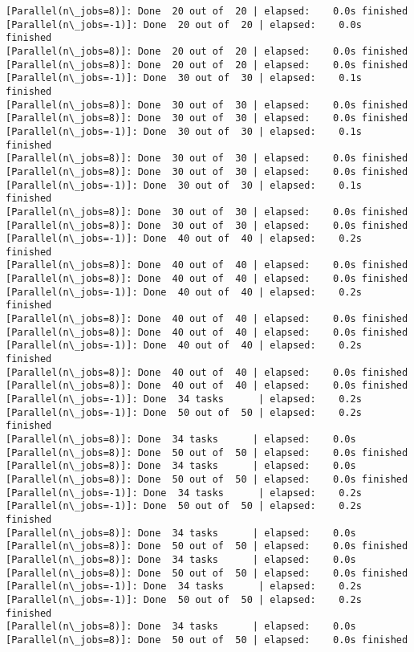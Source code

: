 \documentclass[11pt]{article}
\begin{document}
\begin{Verbatim}[commandchars=\\\{\}]
[Parallel(n\_jobs=8)]: Done  20 out of  20 | elapsed:    0.0s finished
[Parallel(n\_jobs=-1)]: Done  20 out of  20 | elapsed:    0.0s finished
[Parallel(n\_jobs=8)]: Done  20 out of  20 | elapsed:    0.0s finished
[Parallel(n\_jobs=8)]: Done  20 out of  20 | elapsed:    0.0s finished
[Parallel(n\_jobs=-1)]: Done  30 out of  30 | elapsed:    0.1s finished
[Parallel(n\_jobs=8)]: Done  30 out of  30 | elapsed:    0.0s finished
[Parallel(n\_jobs=8)]: Done  30 out of  30 | elapsed:    0.0s finished
[Parallel(n\_jobs=-1)]: Done  30 out of  30 | elapsed:    0.1s finished
[Parallel(n\_jobs=8)]: Done  30 out of  30 | elapsed:    0.0s finished
[Parallel(n\_jobs=8)]: Done  30 out of  30 | elapsed:    0.0s finished
[Parallel(n\_jobs=-1)]: Done  30 out of  30 | elapsed:    0.1s finished
[Parallel(n\_jobs=8)]: Done  30 out of  30 | elapsed:    0.0s finished
[Parallel(n\_jobs=8)]: Done  30 out of  30 | elapsed:    0.0s finished
[Parallel(n\_jobs=-1)]: Done  40 out of  40 | elapsed:    0.2s finished
[Parallel(n\_jobs=8)]: Done  40 out of  40 | elapsed:    0.0s finished
[Parallel(n\_jobs=8)]: Done  40 out of  40 | elapsed:    0.0s finished
[Parallel(n\_jobs=-1)]: Done  40 out of  40 | elapsed:    0.2s finished
[Parallel(n\_jobs=8)]: Done  40 out of  40 | elapsed:    0.0s finished
[Parallel(n\_jobs=8)]: Done  40 out of  40 | elapsed:    0.0s finished
[Parallel(n\_jobs=-1)]: Done  40 out of  40 | elapsed:    0.2s finished
[Parallel(n\_jobs=8)]: Done  40 out of  40 | elapsed:    0.0s finished
[Parallel(n\_jobs=8)]: Done  40 out of  40 | elapsed:    0.0s finished
[Parallel(n\_jobs=-1)]: Done  34 tasks      | elapsed:    0.2s
[Parallel(n\_jobs=-1)]: Done  50 out of  50 | elapsed:    0.2s finished
[Parallel(n\_jobs=8)]: Done  34 tasks      | elapsed:    0.0s
[Parallel(n\_jobs=8)]: Done  50 out of  50 | elapsed:    0.0s finished
[Parallel(n\_jobs=8)]: Done  34 tasks      | elapsed:    0.0s
[Parallel(n\_jobs=8)]: Done  50 out of  50 | elapsed:    0.0s finished
[Parallel(n\_jobs=-1)]: Done  34 tasks      | elapsed:    0.2s
[Parallel(n\_jobs=-1)]: Done  50 out of  50 | elapsed:    0.2s finished
[Parallel(n\_jobs=8)]: Done  34 tasks      | elapsed:    0.0s
[Parallel(n\_jobs=8)]: Done  50 out of  50 | elapsed:    0.0s finished
[Parallel(n\_jobs=8)]: Done  34 tasks      | elapsed:    0.0s
[Parallel(n\_jobs=8)]: Done  50 out of  50 | elapsed:    0.0s finished
[Parallel(n\_jobs=-1)]: Done  34 tasks      | elapsed:    0.2s
[Parallel(n\_jobs=-1)]: Done  50 out of  50 | elapsed:    0.2s finished
[Parallel(n\_jobs=8)]: Done  34 tasks      | elapsed:    0.0s
[Parallel(n\_jobs=8)]: Done  50 out of  50 | elapsed:    0.0s finished

\end{Verbatim}
\end{document}
